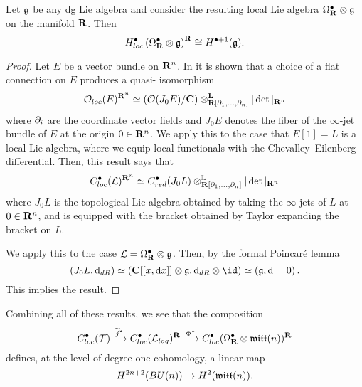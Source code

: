 \documentclass[11pt]{amsart}
\begin{document}
\begin{lem}
Let $\mathfrak{g}$ be any dg Lie algebra and consider the resulting local Lie algebra $\Omega^\bullet_{\mathbf{R}} \otimes \mathfrak{g}$ on the manifold $\mathbf{R}$.
Then
\begin{equation}
H_{loc}^\bullet\left(\Omega^\bullet_{\mathbf{R}} \otimes \mathfrak{g}\right)^{\mathbf{R}} \cong H^{\bullet+1}(\mathfrak{g}) .
\end{equation}
\end{lem}
\begin{proof}
Let $E$ be a vector bundle on $\mathbf{R}^n$.
In \cite[??]{CostelloBook} it is shown that a choice of a flat connection on $E$ produces a quasi- isomorphism 
\begin{equation}
{\mathcal O}_{loc}(E)^{\mathbf{R}^n} \simeq \left(\mathcal O(J_0 E) \slash \mathbf{C}\right) \otimes^{\mathbf{L}}_{\mathbf{R}[\partial_1,\ldots,\partial_n]} |\det|_{\mathbf{R}^n} \end{equation}
where $\partial_i$ are the coordinate vector fields and $J_0 E$ denotes the fiber of the $\infty$-jet bundle of $E$ at the origin $0 \in \mathbf{R}^n$.
We apply this to the case that $E[1] = L$ is a local Lie algebra, where we equip local functionals with the Chevalley--Eilenberg differential.
Then, this result says that
\begin{equation}
C^\bullet_{loc}(\mathcal L)^{\mathbf{R}^n} \simeq C^\bullet_{red}(J_0 L) \otimes^{\mathbb{L}}_{\mathbf{R}[\partial_1,\ldots,\partial_n]} |\det|_{\mathbf{R}^n} 
\end{equation}
where $J_0 L$ is the topological Lie algebra obtained by taking the $\infty$-jets of $L$ at $0 \in \mathbf{R}^n$, and is equipped with the bracket obtained by Taylor expanding the bracket on $L$.

We apply this to the case $\mathcal L = \Omega^\bullet_{\mathbf{R}} \otimes \mathfrak{g}$.
Then, by the formal Poincar\'e lemma
\begin{equation}
(J_0 L, \d_{dR}) \simeq \left(\C[[x,\d x]] \otimes \lie{g}, \d_{dR} \otimes \id\right) \simeq \left(\lie{g}, \d = 0\right) .
\end{equation}
This implies the result.
\end{proof}

Combining all of these results, we see that the composition
\begin{equation}
C_{loc}^\bullet (\mathcal T) \xrightarrow{\widetilde j^*} C^\bullet_{loc}(\mathcal L_{log})^{\mathbf{R}} \xrightarrow{\Phi^*} C^\bullet_{loc}(\Omega^\bullet_{\mathbf{R}} \otimes \mathfrak{witt}(n))^{\mathbf{R}} 
\end{equation}
defines, at the level of degree one cohomology, a linear map
\begin{equation}
H^{2n+2}(BU(n)) \to H^{2} (\mathfrak{witt}(n)) .
\end{equation}
\end{document}

